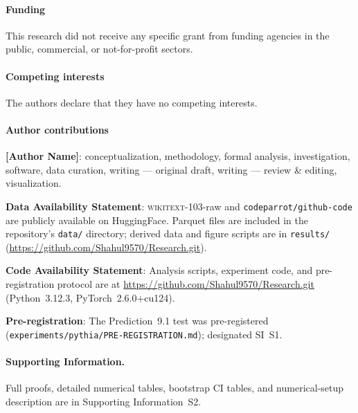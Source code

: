 \documentclass[12pt]{article}
\theoremstyle{remark}
\begin{document}
\paragraph{Funding}
This research did not receive any specific grant from funding agencies in the
public, commercial, or not-for-profit sectors.

\paragraph{Competing interests}
The authors declare that they have no competing interests.

\paragraph{Author contributions}
\textbf{[Author Name]}: conceptualization, methodology, formal analysis,
investigation, software, data curation, writing --- original draft, writing
--- review \& editing, visualization.

\noindent\textbf{Data Availability Statement}:
\textsc{wikitext}-103-raw and \texttt{codeparrot/github-code} are publicly
available on HuggingFace. Parquet files are included in the repository's
\texttt{data/} directory; derived data and figure scripts are in
\texttt{results/}
(\url{https://github.com/Shahul9570/Research.git}).

\noindent\textbf{Code Availability Statement}:
Analysis scripts, experiment code, and pre-registration protocol are at
\url{https://github.com/Shahul9570/Research.git}
(Python~3.12.3, PyTorch~2.6.0+cu124).

\noindent\textbf{Pre-registration}:
The Prediction~9.1 test was pre-registered
(\texttt{experiments/pythia/PRE-REGISTRATION.md}); designated SI~S1.

\paragraph{Supporting Information.}
Full proofs, detailed numerical tables, bootstrap CI tables, and numerical-setup description are in Supporting Information~S2.
\end{document}
